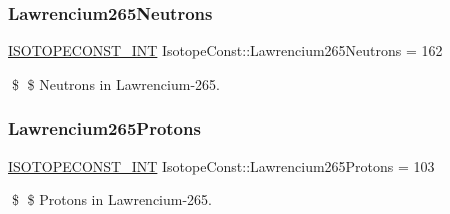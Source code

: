 \subsubsection{\texorpdfstring{Lawrencium265\+Neutrons}{Lawrencium265Neutrons}}
{\footnotesize\ttfamily \mbox{\hyperlink{group___isotope_const-_macros_ga5f18360b3e99483a35c32d789e62621c}{I\+S\+O\+T\+O\+P\+E\+C\+O\+N\+S\+T\+\_\+\+I\+NT}} Isotope\+Const\+::\+Lawrencium265\+Neutrons = 162}

\$ \$ Neutrons in Lawrencium-\/265. \mbox{\label{group___isotope_const-_lawrencium-_lr265_ga33c4e3ee8a4033db01c495810b2fc658}} 
\subsubsection{\texorpdfstring{Lawrencium265\+Protons}{Lawrencium265Protons}}
{\footnotesize\ttfamily \mbox{\hyperlink{group___isotope_const-_macros_ga5f18360b3e99483a35c32d789e62621c}{I\+S\+O\+T\+O\+P\+E\+C\+O\+N\+S\+T\+\_\+\+I\+NT}} Isotope\+Const\+::\+Lawrencium265\+Protons = 103}

\$ \$ Protons in Lawrencium-\/265. 